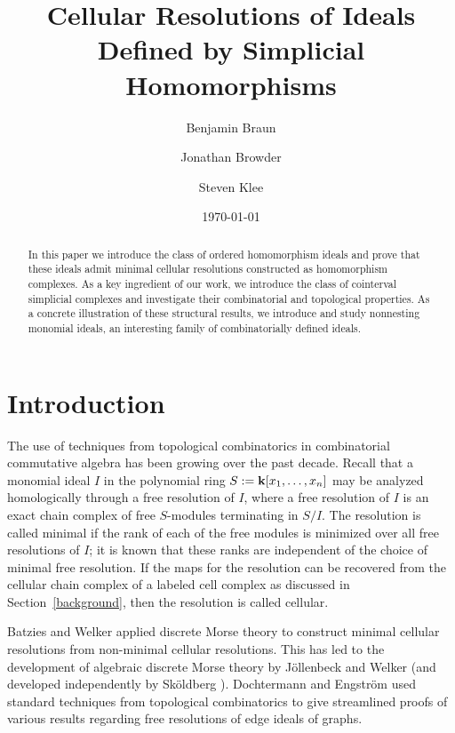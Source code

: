 \documentclass[11pt]{amsart}
\title[]{Cellular Resolutions of Ideals Defined by Simplicial Homomorphisms}
\author{Benjamin Braun}
\author{Jonathan Browder}
\author{Steven Klee}
\date{\today}
\theoremstyle{definition}
\numberwithin{equation}{section}
\theoremstyle{remark}
\numberwithin{equation}{section}
\begin{document}
\maketitle

\begin{abstract}
In this paper we introduce the class of ordered homomorphism ideals and prove that these ideals admit minimal cellular resolutions constructed as homomorphism complexes.
As a key ingredient of our work, we introduce the class of cointerval simplicial complexes and investigate their combinatorial and topological properties.
As a concrete illustration of these structural results, we introduce and study nonnesting monomial ideals, an interesting family of combinatorially defined ideals.
\end{abstract}

\section{Introduction}

The use of techniques from topological combinatorics in combinatorial commutative algebra has been growing over the past decade.
Recall that a monomial ideal $I$ in the polynomial ring $S:={{\bf k}}[x_1,\ldots,x_n]$ may be analyzed homologically through a free resolution of $I$, where a free resolution of $I$ is an exact chain complex of free $S$-modules terminating in $S/I$.
The resolution is called minimal if the rank of each of the free modules is minimized over all free resolutions of $I$; it is known that these ranks are independent of the choice of minimal free resolution.
If the maps for the resolution can be recovered from the cellular chain complex of a labeled cell complex as discussed in Section~\ref{background}, then the resolution is called cellular.

Batzies and Welker \cite{BatziesWelker} applied discrete Morse theory to construct minimal cellular resolutions from non-minimal cellular resolutions.
This has led to the development of algebraic discrete Morse theory by J\"{o}llenbeck and Welker \cite{JollenbeckWelker} (and developed independently by Sk\"{o}ldberg \cite{Skoldberg}).
Dochtermann and Engstr\"{o}m \cite{DochtermannEngstromEdgeIdeals} used standard techniques from topological combinatorics to give streamlined proofs of various results regarding free resolutions of edge ideals of graphs.
\end{document}
